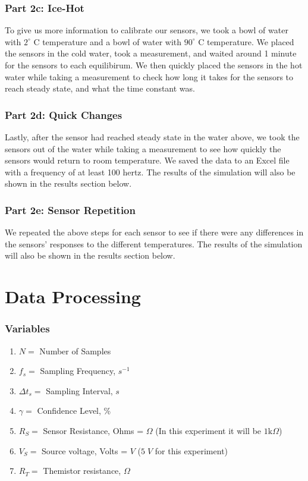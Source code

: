 \documentclass{article}
\begin{document}
\subsubsection{Part 2c: Ice-Hot} %

To give us more information to calibrate our sensors, we took a bowl of water with \( 2^\circ \) C temperature and a bowl of water with \( 90^\circ \) C temperature. We placed the sensors in the cold water, took a measurement, and waited around 1 minute for the sensors to each equilibirum. We then quickly placed the sensors in the hot water while taking a measurement to check how long it takes for the sensors to reach steady state, and what the time constant was.

\subsubsection{Part 2d: Quick Changes} %

Lastly, after the sensor had reached steady state in the water above, we took the sensors out of the water while taking a measurement to see how quickly the sensors would return to room temperature. We saved the data to an Excel file with a frequency of at least 100 hertz. The results of the simulation will also be shown in the results section below.

\subsubsection{Part 2e: Sensor Repetition} %

We repeated the above steps for each sensor to see if there were any differences in the sensors' responses to the different temperatures. The results of the simulation will also be shown in the results section below.

\section{Data Processing}
\subsubsection*{Variables}
\begin{enumerate}[label = \roman*.]
    \item \(N = \) Number of Samples
    \item \(f_{s} = \) Sampling Frequency, $s^{-1}$
    \item \(\Delta t_{s} = \) Sampling Interval, $s$
    \item \(\gamma = \) Confidence Level, \%
    \item \(R_{S} = \) Sensor Resistance, Ohms = $\Omega$ (In this experiment it will be $1\text{k}\Omega$)
    \item \(V_{S} = \) Source voltage, Volts = $V$ ($5\;V$ for this experiment)
    \item \(R_{T} = \) Themistor resistance, $\Omega$
\end{enumerate}
\end{document}
